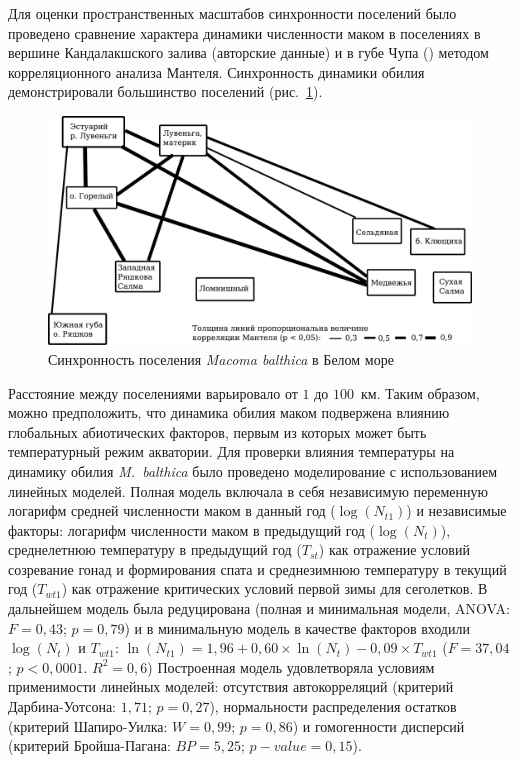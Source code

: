 {Для оценки пространственных масштабов синхронности поселений было проведено сравнение характера динамики численности маком в поселениях в вершине Кандалакшского залива (авторские данные) и в губе Чупа (\cite{Maximovich_et_al_1991, Gerasimova_Maximovich_2013, Varfolomeeva_Naumov_2013}) методом корреляционного анализа Мантеля.
Синхронность динамики обилия демонстрировали большинство поселений (рис.~\ref{ris:mantel}).
	\begin{figure}[]
	\begin{center}	
		\includegraphics[width=\textwidth]{../White_Sea/dynamic_N_N1/mantel1.pdf}
	\end{center}
		\caption{Синхронность поселения \textit{Macoma balthica} в Белом море}
		\label{ris:mantel}
	\end{figure}
Расстояние между поселениями варьировало от $1$ до $100$~км.
Таким образом, можно предположить, что динамика обилия маком подвержена влиянию глобальных абиотических факторов, первым из которых может быть температурный режим акватории. 
Для проверки влияния температуры на динамику обилия \textit{M.~balthica} было проведено моделирование с использованием линейных моделей. 
Полная модель включала в себя независимую переменную логарифм средней численности маком в данный год ($\log(N_{t1})$) и независимые факторы: логарифм численности маком в предыдущий год ($\log(N_{t})$), среднелетнюю температуру в предыдущий год ($T_{st}$) как отражение условий созревание гонад и формирования спата и среднезимнюю температуру в текущий год ($T_{wt1}$) как отражение критических условий первой зимы для сеголетков. 
В дальнейшем модель была редуцирована (полная и минимальная модели, ANOVA: $F = 0,43$; $p = 0,79$) и в минимальную модель в качестве факторов входили $\log(N_{t})$ и $T_{wt1}$: $\ln(N_{t1}) = 1,96 + 0,60 \times \ln(N_{t}) - 0,09 \times T_{wt1}$ ($F = 37,04$; $p < 0,0001$. $R^2 = 0,6$)
Построенная модель удовлетворяла условиям применимости линейных моделей: отсутствия автокорреляций (критерий Дарбина-Уотсона: $1,71$; $p = 0,27$), нормальности распределения остатков (критерий Шапиро-Уилка: $W = 0,99$; $p = 0,86$) и гомогенности дисперсий (критерий Бройша-Пагана: $BP = 5,25$; $p-value = 0,15$). 

}
